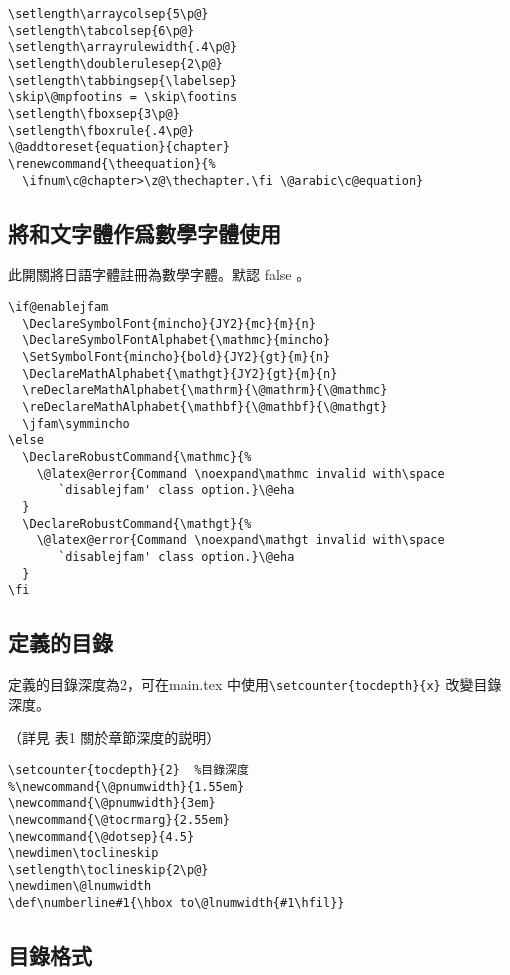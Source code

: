 \begin{lstlisting}[firstnumber=1274]
\setlength\arraycolsep{5\p@}
\setlength\tabcolsep{6\p@}
\setlength\arrayrulewidth{.4\p@}
\setlength\doublerulesep{2\p@}
\setlength\tabbingsep{\labelsep}
\skip\@mpfootins = \skip\footins
\setlength\fboxsep{3\p@}
\setlength\fboxrule{.4\p@}
\@addtoreset{equation}{chapter}
\renewcommand{\theequation}{%
  \ifnum\c@chapter>\z@\thechapter.\fi \@arabic\c@equation}
\end{lstlisting}

\subsection{將和文字體作爲數學字體使用}

\par%
此開關將日語字體註冊為數學字體。默認 false 。
\begin{lstlisting}[firstnumber=1286]
%%% SZ.cls原先默認定義的字體，重要。
\if@enablejfam
  \DeclareSymbolFont{mincho}{JY2}{mc}{m}{n}
  \DeclareSymbolFontAlphabet{\mathmc}{mincho}
  \SetSymbolFont{mincho}{bold}{JY2}{gt}{m}{n}
  \DeclareMathAlphabet{\mathgt}{JY2}{gt}{m}{n}
  \reDeclareMathAlphabet{\mathrm}{\@mathrm}{\@mathmc}
  \reDeclareMathAlphabet{\mathbf}{\@mathbf}{\@mathgt}
  \jfam\symmincho
\else
  \DeclareRobustCommand{\mathmc}{%
    \@latex@error{Command \noexpand\mathmc invalid with\space
       `disablejfam' class option.}\@eha
  }
  \DeclareRobustCommand{\mathgt}{%
    \@latex@error{Command \noexpand\mathgt invalid with\space
       `disablejfam' class option.}\@eha
  }
\fi
\end{lstlisting}

\subsection{定義的目錄}

\par%
定義的目錄深度為2，可在main.tex 中使用\verb+\setcounter{tocdepth}{x}+
改變目錄深度。
\par%
（詳見 表1 關於章節深度的説明）
%
\begin{lstlisting}[firstnumber=1307]
\setcounter{tocdepth}{2}  %目錄深度
%\newcommand{\@pnumwidth}{1.55em}
\newcommand{\@pnumwidth}{3em}
\newcommand{\@tocrmarg}{2.55em}
\newcommand{\@dotsep}{4.5}
\newdimen\toclineskip
\setlength\toclineskip{2\p@}
\newdimen\@lnumwidth
\def\numberline#1{\hbox to\@lnumwidth{#1\hfil}}
\end{lstlisting}

\subsection{目錄格式}


